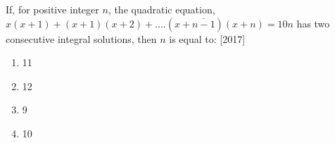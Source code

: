 \iffalse
\title{Assignment-1}
\author{EE24BTECH11020 - Ellanti Rohith}
\section{mains}
\fi
	\item {If, for positive integer $n$, the quadratic equation,\vspace{.5em} $x(x+1)+(x+1)(x+2)+....(x+\overline{n-1})(x+n)=10n$ \vspace{.5em} has two consecutive integral solutions, then $n$ is equal to:     \hfill{[2017]} \begin{multicols}{2} 
\begin{enumerate}
    \item {11}
    \item{12}
    \columnbreak
    \item {9} 
    \item{10}\end{enumerate} 
    \end{multicols}}



